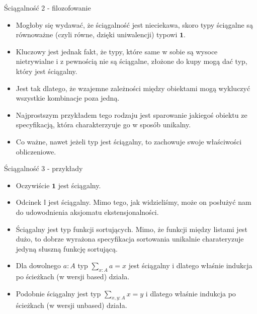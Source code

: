 \documentclass{beamer}
\newcommand{\I}{\mathbb{I}}
\begin{document}
\begin{frame}{Ściągalność 2 - filozofowanie}
\begin{itemize}
	\item Mogłoby się wydawać, że ściągalność jest nieciekawa, skoro typy ściągalne są równoważne (czyli równe, dzięki uniwalencji) typowi $\textbf{1}$.
	\item Kluczowy jest jednak fakt, że typy, które same w sobie są wysoce nietrywialne i z pewnością nie są ściągalne, złożone do kupy mogą dać typ, który jest ściągalny.
	\item Jest tak dlatego, że wzajemne zależności między obiektami mogą wykluczyć wszystkie kombinacje poza jedną.
	\item Najprostszym przykładem tego rodzaju jest sparowanie jakiegoś obiektu ze specyfikacją, która charakterzyuje go w sposób unikalny.
	\item Co ważne, nawet jeżeli typ jest ściągalny, to zachowuje swoje właściwości obliczeniowe.
\end{itemize}
\end{frame}

\begin{frame}{Ściągalność 3 - przykłady}
\begin{itemize}
	\item Oczywiście $\textbf{1}$ jest ściągalny.
	\item Odcinek $\I$ jest ściągalny. Mimo tego, jak widzieliśmy, może on posłużyć nam do udowodnienia aksjomatu ekstensjonalności.
	\item Ściągalny jest typ funkcji sortujących. Mimo, że funkcji między listami jest dużo, to dobrze wyrażona specyfikacja sortowania unikalnie charateryzuje jedyną słuszną funkcję sortującą.
	\item Dla dowolnego $a : A$ typ $\sum_{x : A} a = x$ jest ściągalny i dlatego właśnie indukcja po ścieżkach (w wersji based) działa.
	\item Podobnie ściągalny jest typ $\sum_{x,y : A} x = y$ i dlatego właśnie indukcja po ścieżkach (w wersji unbased) działa.
\end{itemize}
\end{frame}
\end{document}
